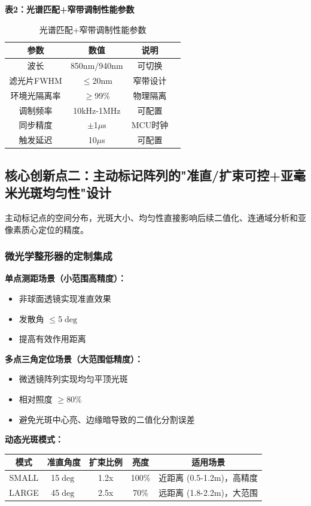 \documentclass[12pt, a4paper]{ctexart}
\begin{document}
\textbf{表2：光谱匹配+窄带调制性能参数}

\begin{table}[htbp]
\centering
\caption{光谱匹配+窄带调制性能参数}
\begin{tabular}{cccc}
\toprule
参数 & 数值 & 说明 \\
\midrule
波长 & 850nm/940nm & 可切换 \\
滤光片FWHM & $\le$20nm & 窄带设计 \\
环境光隔离率 & $\ge$99\% & 物理隔离 \\
调制频率 & 10kHz-1MHz & 可配置 \\
同步精度 & $\pm$1$\mu$s & MCU时钟 \\
触发延迟 & 10$\mu$s & 可配置 \\
\bottomrule
\end{tabular}
\end{table}

\subsection{核心创新点二：主动标记阵列的"准直/扩束可控+亚毫米光斑均匀性"设计}

主动标记点的空间分布，光斑大小、均匀性直接影响后续二值化、连通域分析和亚像素质心定位的精度。

\subsubsection{微光学整形器的定制集成}

\textbf{单点测距场景（小范围高精度）：}
\begin{itemize}
\item 非球面透镜实现准直效果
\item 发散角 $\le$5$\deg$
\item 提高有效作用距离
\end{itemize}

\textbf{多点三角定位场景（大范围低精度）：}
\begin{itemize}
\item 微透镜阵列实现均匀平顶光斑
\item 相对照度 $\ge$80\%
\item 避免光斑中心亮、边缘暗导致的二值化分割误差
\end{itemize}

\textbf{动态光斑模式：}

\begin{tabular}{ccccc}
\toprule
模式 & 准直角度 & 扩束比例 & 亮度 & 适用场景 \\
\midrule
SMALL & 15$\deg$ & 1.2x & 100\% & 近距离 (0.5-1.2m)，高精度 \\
LARGE & 45$\deg$ & 2.5x & 70\% & 远距离 (1.8-2.2m)，大范围 \\
\bottomrule
\end{tabular}
\end{document}
